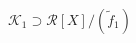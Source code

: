 \documentclass[preview]{standalone}
\begin{document}
\begin{center}
$ \mathcal{K}_1 \supset \mathcal{R}[X]/(\tilde{f}_1)$
\end{center}
\end{document}

